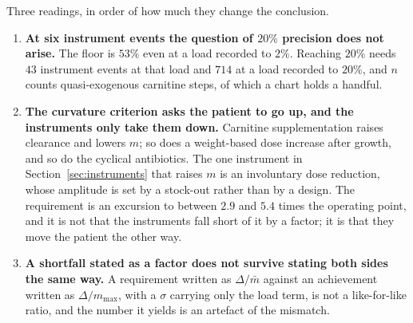 \begin{center}
\scriptsize

\end{center}

Three readings, in order of how much they change the conclusion.

\begin{enumerate}[leftmargin=*, itemsep=2pt]
\item \textbf{At six instrument events the question of $20\%$ precision does not arise.}
      The floor is $53\%$ even at a load recorded to $2\%$. Reaching $20\%$ needs $43$
      instrument events at that load and $714$ at a load recorded to $20\%$, and $n$ counts
      quasi-exogenous carnitine steps, of which a chart holds a handful.
\item \textbf{The curvature criterion asks the patient to go up, and the instruments only
      take them down.} Carnitine supplementation raises clearance and lowers $m$; so does a
      weight-based dose increase after growth, and so do the cyclical antibiotics. The one
      instrument in Section~\ref{sec:instruments} that raises $m$ is an involuntary dose
      reduction, whose amplitude is set by a stock-out rather than by a design. The
      requirement is an excursion to between $2.9$ and $5.4$ times the operating point, and
      it is not that the instruments fall short of it by a factor; it is that they move the
      patient the other way.
\item \textbf{A shortfall stated as a factor does not survive stating both sides the same
      way.} A requirement written as $\Delta/\bar m$ against an achievement written as
      $\Delta/m_{\max}$, with a $\sigma$ carrying only the load term, is not a like-for-like
      ratio, and the number it yields is an artefact of the mismatch.
\end{enumerate}

